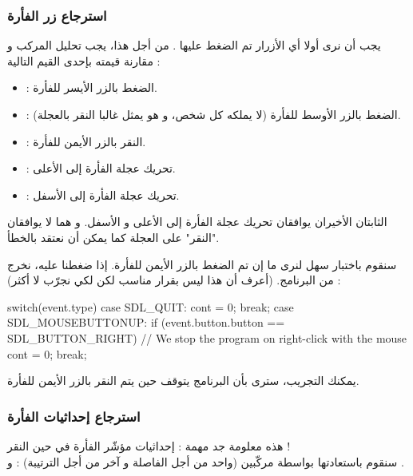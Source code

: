 \subsubsection{استرجاع زر الفأرة}

يجب أن نرى أولا أي الأزرار تم الضغط عليها . من أجل هذا، يجب تحليل المركب
و مقارنة قيمته بإحدى القيم التالية :

\begin{itemize}
	\item {} :
	الضغط بالزر الأيسر للفأرة.
	\item {} :
	الضغط بالزر الأوسط للفأرة (لا يملكه كل شخص، و هو يمثل غالبا النقر بالعجلة).
	\item {} :
	النقر بالزر الأيمن للفأرة.
	\item {} :
	تحريك عجلة الفأرة إلى الأعلى.
	\item {} :
	تحريك عجلة الفأرة إلى الأسفل.
\end{itemize}

\begin{information}
الثابتان الأخيران يوافقان تحريك عجلة الفأرة إلى الأعلى و الأسفل. و هما لا يوافقان "النقر" على العجلة كما يمكن أن نعتقد بالخطأ.
\end{information}

سنقوم باختبار سهل لنرى ما إن تم الضغط بالزر الأيمن للفأرة. إذا ضغطنا عليه، نخرج من البرنامج. (أعرف أن هذا ليس بقرار مناسب لكن لكي نجرّب لا أكثر) :

\begin{Csource}
switch(event.type)
{
	case SDL_QUIT:
	cont = 0;
	break;
	case SDL_MOUSEBUTTONUP:
	if (event.button.button == SDL_BUTTON_RIGHT) 
	// We stop the program on right-click with the mouse
		cont = 0;
	break;
}
\end{Csource}

يمكنك التجريب، سترى بأن البرنامج يتوقف حين يتم النقر بالزر الأيمن للفأرة.

\subsubsection{استرجاع إحداثيات الفأرة}

هذه معلومة جد مهمة : إحداثيات مؤشّر الفأرة في حين النقر !\\
سنقوم باستعادتها بواسطة مركّبين (واحد من أجل الفاصلة و آخر من أجل الترتيبة) :
و
.

